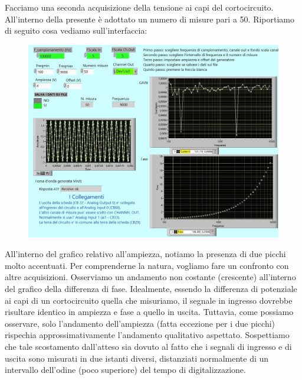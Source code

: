 Facciamo una seconda acquisizione della tensione ai capi del cortocircuito. All'interno della presente è adottato un numero di misure pari a 50. Riportiamo di seguito cosa vediamo sull'interfaccia:
\begin{figure}[H]
\caption{}
    \includegraphics[width=12cm]{settimana_2/immagini/corto_2.jpg}
    \centering
\end{figure}
All'interno del grafico relativo all'ampiezza, notiamo la presenza di due picchi molto accentuati. Per comprenderne la natura, vogliamo fare un confronto con altre acquisizioni.
Osserviamo un andamento non costante (crescente) all'interno del grafico della differenza di fase. Idealmente, essendo la differenza di potenziale ai capi di un cortocircuito quella che misuriamo, il segnale in ingresso dovrebbe risultare identico in ampiezza e fase a quello in uscita. Tuttavia, come possiamo osservare, solo l'andamento dell'ampiezza (fatta eccezione per i due picchi) rispechia approssimativamente l'andamento qualitativo aspettato. Sospettiamo che tale scostamento dall'atteso sia dovuto al fatto che i segnali di ingresso e di uscita sono misurati in due istanti diversi, distanziati normalmente di un intervallo dell'odine (poco superiore) del tempo di digitalizzazione. 



